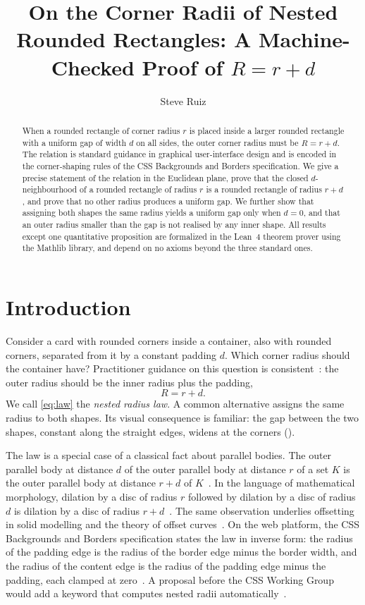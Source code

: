 \documentclass[a4paper,UKenglish,cleveref,autoref,thm-restate]{lipics-v2021}
\title{On the Corner Radii of Nested Rounded Rectangles: A Machine-Checked Proof of $R = r + d$}
\author{Steve Ruiz}{tldraw, London, United Kingdom}{}{}{}
\begin{document}
\maketitle

\begin{abstract}
When a rounded rectangle of corner radius $r$ is placed inside a larger rounded rectangle with a
uniform gap of width $d$ on all sides, the outer corner radius must be $R = r + d$. The relation is
standard guidance in graphical user-interface design and is encoded in the corner-shaping rules of
the CSS Backgrounds and Borders specification. We give a precise statement of the relation in the
Euclidean plane, prove that the closed $d$-neighbourhood of a rounded rectangle of radius $r$ is a
rounded rectangle of radius $r + d$, and prove that no other radius produces a uniform gap. We
further show that assigning both shapes the same radius yields a uniform gap only when $d = 0$,
and that an outer radius smaller than the gap is not realised by any inner shape. All results
except one quantitative proposition are formalized in the Lean~4 theorem prover using the Mathlib
library, and depend on no axioms beyond the three standard ones.
\end{abstract}

\section{Introduction}\label{sec:intro}

Consider a card with rounded corners inside a container, also with rounded corners, separated from
it by a constant padding $d$. Which corner radius should the container have? Practitioner guidance
on this question is consistent~\cite{hebert2022,coyier2024}: the outer radius should be the inner
radius plus the padding,
\begin{equation}\label{eq:law}
  R = r + d .
\end{equation}
We call \eqref{eq:law} the \emph{nested radius law}. A common alternative assigns the same radius
to both shapes. Its visual consequence is familiar: the gap between the two shapes, constant along
the straight edges, widens at the corners ().

The law is a special case of a classical fact about parallel bodies. The outer parallel body at
distance $d$ of the outer parallel body at distance $r$ of a set $K$ is the outer parallel body at
distance $r + d$ of $K$~\cite{steiner1840,minkowski1903,hadwiger1957,schneider2014}. In the
language of mathematical morphology, dilation by a disc of radius $r$ followed by dilation by a disc
of radius $d$ is dilation by a disc of radius $r + d$~\cite{matheron1975,serra1982}. The same
observation underlies offsetting in solid modelling and the theory of offset
curves~\cite{rossignac1986,maekawa1999}. On the web platform, the CSS Backgrounds and Borders
specification states the law in inverse form: the radius of the padding edge is the radius of the
border edge minus the border width, and the radius of the content edge is the radius of the padding
edge minus the padding, each clamped at zero~\cite{css3backgrounds}. A proposal before the CSS
Working Group would add a keyword that computes nested radii automatically~\cite{argyle2022}.
\end{document}

